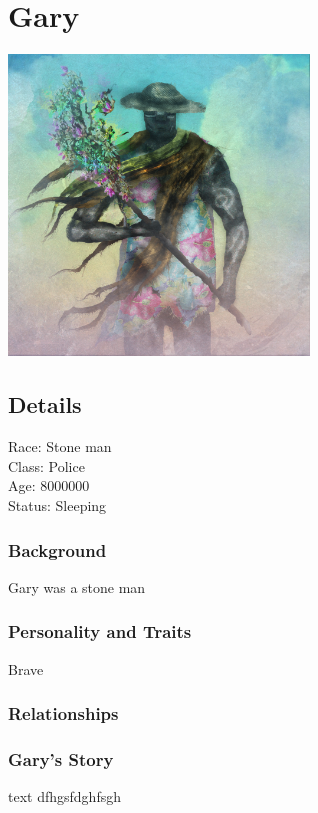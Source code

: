 \section{Gary}

\begin{center}
\includegraphics[width=80mm]{./content/img/gary.png}
\begin{figure}[h]
\end{figure}
\end{center}

\subsection*{Details} 

\noindent

Race: 	Stone man \\
Class: 	Police \\
Age: 	8000000 \\
Status: Sleeping 

\subsubsection*{Background}

Gary was a stone man

\subsubsection{Personality and Traits}

Brave

\subsubsection{Relationships}



\subsubsection{Gary's Story}



\begin{DndSidebar}{text}
 dfhgsfdghfsgh
\end{DndSidebar}

\smallskip

\bigskip


\clearpage